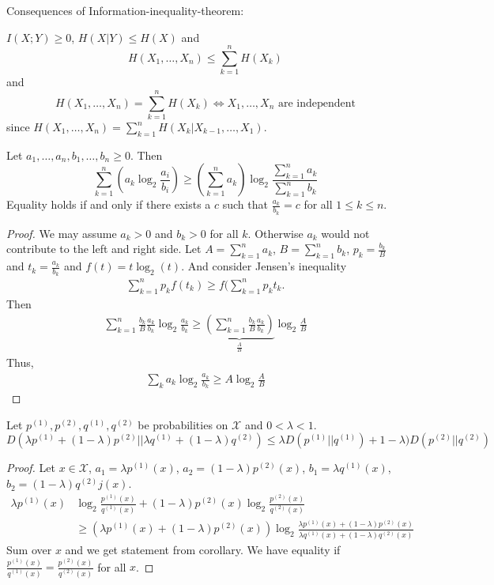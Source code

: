 \documentclass[mfit.tex]{subfiles}
\begin{document}
Consequences of Information-inequality-theorem:

$I(X;Y) \geq 0$, $H(X|Y) \leq H(X)$ and
\[ H(X_1,\dots,X_n) \leq \sum_{k=1}^n H(X_k) \]
and 
\[ H(X_1,\dots,X_n) = \sum_{k=1}^n H(X_k) \iff X_1,\dots,X_n \text{ are independent} \]
since $H(X_1,\dots,X_n) = \sum_{k=1}^n H(X_k | X_{k-1}, \dots, X_1)$.

\begin{lemma}
  Let $a_1,\dots,a_n,b_1,\dots,b_n \geq 0$. Then
  \[ \sum_{k=1}^n \left( a_k \log_2 \frac{a_i}{b_i} \right) \geq \left( \sum_{k=1}^n a_k \right) \log_2 \frac{\sum_{k=1}^n a_k}{\sum_{k=1}^n b_k} \]
  Equality holds if and only if there exists a $c$ such that $\frac{a_k}{b_k} = c$ for all $1 \leq k \leq n$.
\end{lemma}

\begin{proof}
  We may assume $a_k > 0$ and $b_k > 0$ for all $k$. Otherwise $a_k$ would not contribute to the left and right side.
  Let $A = \sum_{k=1}^n a_k$, $B = \sum_{k=1}^n b_k$, $p_k = \frac{b_k}{B}$ and $t_k = \frac{a_k}{b_k}$ and $f(t) = t \log_2(t)$.
  And consider Jensen's inequality
  \begin{align*}
    \sum_{k=1}^n p_k f(t_k) \geq f(\sum_{k=1}^n p_k t_k \text{.}
  \end{align*}
  Then
  \begin{align*}
    \sum_{k=1}^n \frac{b_k}{B} \frac{a_k}{b_k} \log_2 \frac{a_k}{b_k} \geq \underbrace{\left( \sum_{k=1}^n \frac{b_k}{B} \frac{a_k}{b_k} \right)}_{\frac{A}{B}} \log_2 \frac{A}{B}
  \end{align*}
  Thus,
  \begin{align*}
    \sum_k a_k \log_2 \frac{a_k}{b_k} \geq A \log_2 \frac{A}{B}
  \end{align*}
\end{proof}

\begin{cor}
  Let $p^{(1)},p^{(2)},q^{(1)},q^{(2)}$ be probabilities on $\mathcal{X}$ and $0 < \lambda < 1$.
  \[ D(\lambda p^{(1)} + (1-\lambda) p^{(2)} || \lambda q^{(1)} + (1-\lambda) q^{(2)}) \leq \lambda D(p^{(1)}||q^{(1)}) + 1-\lambda) D(p^{(2)}||q^{(2)}) \]
\end{cor}

\begin{proof}
  Let $x \in \mathcal{X}$, $a_1 = \lambda p^{(1)}(x)$, $a_2 = (1-\lambda) p^{(2)}(x)$, $b_1 = \lambda q^{(1)}(x)$, $b_2 = (1-\lambda) q^{(2)}j(x)$.
  \begin{align*}
    \lambda p^{(1)}(x) &\log_2 \frac{p^{(1)}(x)}{q^{(1)}(x)} + (1-\lambda) p^{(2)}(x) \log_2 \frac{p^{(2)}(x)}{q^{(2)}(x)} \\
    &\geq \left( \lambda p^{(1)}(x) + (1-\lambda) p^{(2)}(x) \right) \log_2 \frac{\lambda p^{(1)}(x) + (1-\lambda) p^{(2)}(x)}{\lambda q^{(1)}(x) + (1-\lambda) q^{(2)}(x)}
  \end{align*}
  Sum over $x$ and we get statement from corollary.
  We have equality if $\frac{p^{(1)}(x)}{q^{(1)}(x)} = \frac{p^{(2)}(x)}{q^{(2)}(x)}$ for all $x$.
\end{proof}
\end{document}
